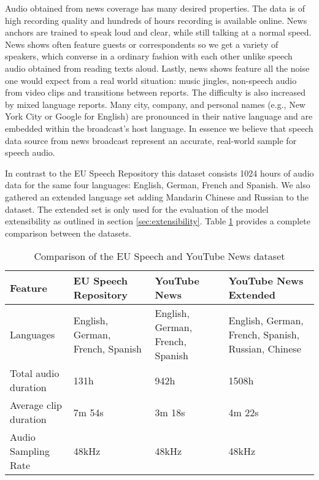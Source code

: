  	
  	Audio obtained from news coverage has many desired properties. The data is of high recording quality and hundreds of hours recording is available online. News anchors are trained to speak loud and clear, while still talking at a normal speed. News shows often feature guests or correspondents so we get a variety of speakers, which converse in a ordinary fashion with each other unlike speech audio obtained from reading texts aloud. Lastly, news shows feature all the noise one would expect from a real world situation: music jingles, non-speech audio from video clips and transitions between reports. The difficulty is also increased by mixed language reports. Many city, company, and personal names (e.g., New York City or Google for English) are pronounced in their native language and are embedded within the broadcast's host language. In essence we believe that speech data source from news broadcast represent an accurate, real-world sample for speech audio.
  	
  	In contrast to the EU Speech Repository this dataset consists 1024 hours of audio data for the same four languages: English, German, French and Spanish. We also gathered an extended language set adding Mandarin Chinese and Russian to the dataset. The extended set is only used for the evaluation of the model extensibility as outlined in section \ref{sec:extensibility}. Table \ref{tab:dataset_comparison} provides a complete comparison between the datasets.
  	
  	
\begin{table}[]
\centering
\begin{tabularx}{\textwidth}{lXXX}
\toprule
Feature               & EU Speech Repository & YouTube News & YouTube News \mbox{Extended} \\ 
\midrule
Languages             & English, German, French, Spanish & English, German, French, Spanish & English, German, French, Spanish, Russian, Chinese \\
Total audio duration  & 131h   & 942h   & 1508h   \\
Average clip duration & 7m 54s & 3m 18s & 4m 22s  \\
Audio Sampling Rate   & 48kHz  & 48kHz  & 48kHz   \\ 
\bottomrule
\end{tabularx}
\caption{Comparison of the EU Speech and YouTube News dataset}
\label{tab:dataset_comparison}
\end{table}

	


